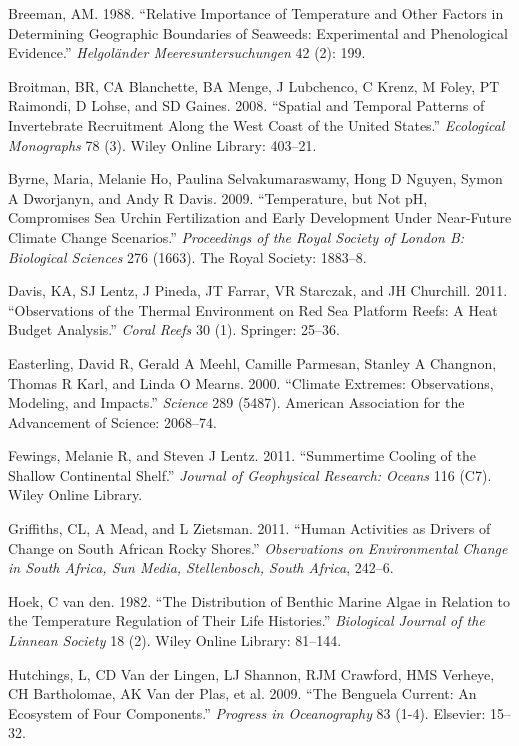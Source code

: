 \documentclass[12pt,A4paper,]{article}
\begin{document}
\hypertarget{ref-Breeman1988}{}
Breeman, AM. 1988. ``Relative Importance of Temperature and Other
Factors in Determining Geographic Boundaries of Seaweeds: Experimental
and Phenological Evidence.'' \emph{Helgoländer Meeresuntersuchungen} 42
(2): 199.

\hypertarget{ref-Broitman2008}{}
Broitman, BR, CA Blanchette, BA Menge, J Lubchenco, C Krenz, M Foley, PT
Raimondi, D Lohse, and SD Gaines. 2008. ``Spatial and Temporal Patterns
of Invertebrate Recruitment Along the West Coast of the United States.''
\emph{Ecological Monographs} 78 (3). Wiley Online Library: 403--21.

\hypertarget{ref-Byrne2009}{}
Byrne, Maria, Melanie Ho, Paulina Selvakumaraswamy, Hong D Nguyen, Symon
A Dworjanyn, and Andy R Davis. 2009. ``Temperature, but Not pH,
Compromises Sea Urchin Fertilization and Early Development Under
Near-Future Climate Change Scenarios.'' \emph{Proceedings of the Royal
Society of London B: Biological Sciences} 276 (1663). The Royal Society:
1883--8.

\hypertarget{ref-Davis2011}{}
Davis, KA, SJ Lentz, J Pineda, JT Farrar, VR Starczak, and JH Churchill.
2011. ``Observations of the Thermal Environment on Red Sea Platform
Reefs: A Heat Budget Analysis.'' \emph{Coral Reefs} 30 (1). Springer:
25--36.

\hypertarget{ref-Easterling2000}{}
Easterling, David R, Gerald A Meehl, Camille Parmesan, Stanley A
Changnon, Thomas R Karl, and Linda O Mearns. 2000. ``Climate Extremes:
Observations, Modeling, and Impacts.'' \emph{Science} 289 (5487).
American Association for the Advancement of Science: 2068--74.

\hypertarget{ref-Fewings2011}{}
Fewings, Melanie R, and Steven J Lentz. 2011. ``Summertime Cooling of
the Shallow Continental Shelf.'' \emph{Journal of Geophysical Research:
Oceans} 116 (C7). Wiley Online Library.

\hypertarget{ref-Griffiths2011}{}
Griffiths, CL, A Mead, and L Zietsman. 2011. ``Human Activities as
Drivers of Change on South African Rocky Shores.'' \emph{Observations on
Environmental Change in South Africa, Sun Media, Stellenbosch, South
Africa}, 242--6.

\hypertarget{ref-Hoek1982}{}
Hoek, C van den. 1982. ``The Distribution of Benthic Marine Algae in
Relation to the Temperature Regulation of Their Life Histories.''
\emph{Biological Journal of the Linnean Society} 18 (2). Wiley Online
Library: 81--144.

\hypertarget{ref-Hutchings2009}{}
Hutchings, L, CD Van der Lingen, LJ Shannon, RJM Crawford, HMS Verheye,
CH Bartholomae, AK Van der Plas, et al. 2009. ``The Benguela Current: An
Ecosystem of Four Components.'' \emph{Progress in Oceanography} 83
(1-4). Elsevier: 15--32.
\end{document}
